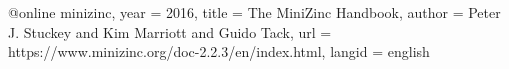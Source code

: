 @online{ minizinc,
    year        = {2016},
    title       = {The MiniZinc Handbook},
    author      = {Peter J. Stuckey and Kim Marriott and Guido Tack},
    url         = {https://www.minizinc.org/doc-2.2.3/en/index.html},
    langid      = {english}
}
